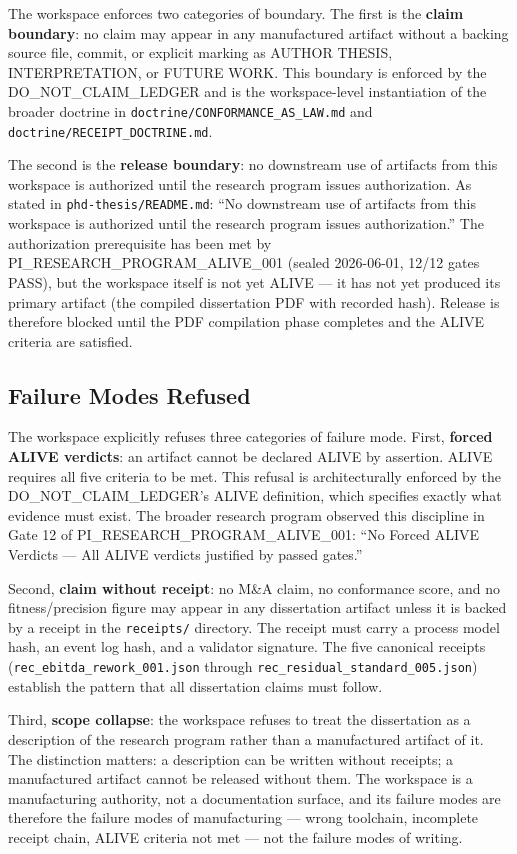 The workspace enforces two categories of boundary. The first is the \textbf{claim boundary}:
no claim may appear in any manufactured artifact without a backing source file, commit, or
explicit marking as AUTHOR THESIS, INTERPRETATION, or FUTURE WORK. This boundary is enforced
by the DO\_NOT\_CLAIM\_LEDGER and is the workspace-level instantiation of the broader
doctrine in \texttt{doctrine/CONFORMANCE\_AS\_LAW.md} and
\texttt{doctrine/RECEIPT\_DOCTRINE.md}.

The second is the \textbf{release boundary}: no downstream use of artifacts from this workspace
is authorized until the research program issues authorization. As stated in
\texttt{phd-thesis/README.md}: ``No downstream use of artifacts from this workspace is
authorized until the research program issues authorization.'' The authorization prerequisite
has been met by PI\_RESEARCH\_PROGRAM\_ALIVE\_001 (sealed 2026-06-01, 12/12 gates PASS),
but the workspace itself is not yet ALIVE --- it has not yet produced its primary artifact
(the compiled dissertation PDF with recorded hash). Release is therefore blocked until the
PDF compilation phase completes and the ALIVE criteria are satisfied.

\subsection{Failure Modes Refused}
\label{sec:phd-thesis-arch-refusals}

The workspace explicitly refuses three categories of failure mode. First, \textbf{forced ALIVE
verdicts}: an artifact cannot be declared ALIVE by assertion. ALIVE requires all five criteria
to be met. This refusal is architecturally enforced by the DO\_NOT\_CLAIM\_LEDGER's ALIVE
definition, which specifies exactly what evidence must exist. The broader research program
observed this discipline in Gate 12 of PI\_RESEARCH\_PROGRAM\_ALIVE\_001: ``No Forced ALIVE
Verdicts --- All ALIVE verdicts justified by passed gates.''

Second, \textbf{claim without receipt}: no M\&A claim, no conformance score, and no
fitness/precision figure may appear in any dissertation artifact unless it is backed by a
receipt in the \texttt{receipts/} directory. The receipt must carry a process model hash,
an event log hash, and a validator signature. The five canonical receipts
(\texttt{rec\_ebitda\_rework\_001.json} through \texttt{rec\_residual\_standard\_005.json})
establish the pattern that all dissertation claims must follow.

Third, \textbf{scope collapse}: the workspace refuses to treat the dissertation as a
description of the research program rather than a manufactured artifact of it. The distinction
matters: a description can be written without receipts; a manufactured artifact cannot be
released without them. The workspace is a manufacturing authority, not a documentation surface,
and its failure modes are therefore the failure modes of manufacturing --- wrong toolchain,
incomplete receipt chain, ALIVE criteria not met --- not the failure modes of writing.
